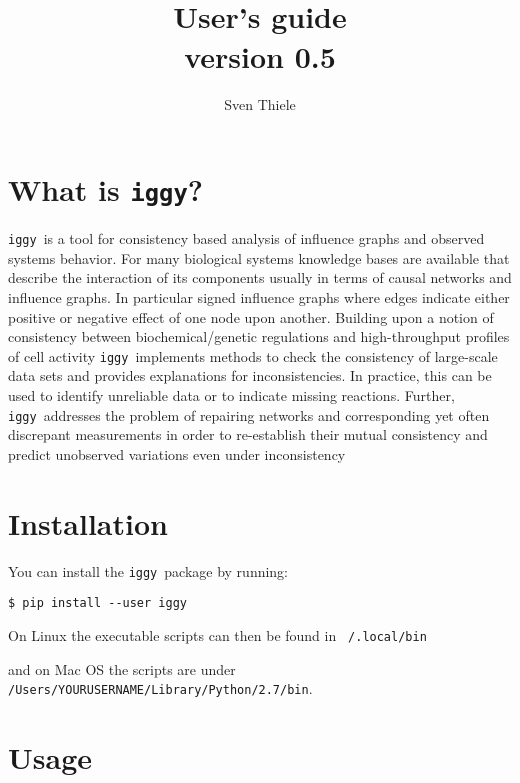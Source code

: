 \documentclass{article}
\title{ \iggy  \\
User's guide \\
version 0.5
}
\author{Sven Thiele}
\date{}
\newcommand\iggy{\texttt{iggy}}
\begin{document}
\maketitle


\section{What is \iggy?}

\iggy\ is a tool for consistency based analysis of influence graphs and observed systems behavior.
For many biological systems knowledge bases are available that describe the interaction of its components 
 usually in terms of causal networks and influence graphs. 
In particular signed influence graphs where edges indicate either positive or negative effect of one node upon another.
Building upon a notion of consistency between biochemical/genetic regulations and high-throughput profiles of cell activity
\iggy\ implements methods to check the consistency of large-scale data sets and
 provides explanations for inconsistencies. 
In practice, this can be used to identify unreliable data or to indicate missing reactions. 
Further, \iggy\ addresses the problem of repairing networks and corresponding yet often discrepant measurements
in order to re-establish their mutual consistency and predict unobserved variations even under inconsistency
 
 
\section{Installation}

You can install the \iggy\ package by running:

\begin{Verbatim}[frame=single]
$ pip install --user iggy
\end{Verbatim} 


On Linux the executable scripts can then be found in \texttt{~/.local/bin}

and on Mac OS the scripts are under \texttt{/Users/YOURUSERNAME/Library/Python/2.7/bin}.



\section{Usage}
\end{document}
